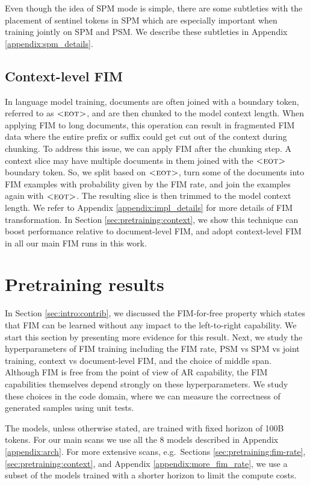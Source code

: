 \documentclass[postscript]{article}
\begin{document}
Even though the idea of SPM mode is simple, there are some subtleties with the placement of sentinel tokens in SPM which are especially important when training jointly on SPM and PSM. We describe these subtleties in Appendix \ref{appendix:spm_details}.
 
\subsection{Context-level FIM}\label{sec:contex_impl}

In language model training,  documents are often joined with a boundary token, referred to as $\textsc{<eot>}$, and are then chunked to the model context length.
When  applying FIM to long documents, this operation can result in fragmented FIM data where the entire prefix or suffix could get cut out of the context during chunking. To address this issue, we can apply FIM after the chunking step. A context slice may have multiple documents in them joined with the $\textsc{<eot>}$ boundary token. So, we split based on $\textsc{<eot>}$, turn some of the documents into FIM examples with probability given by the FIM rate, and join the examples again with $\textsc{<eot>}$. The resulting slice is then trimmed to the model context length. We refer to Appendix \ref{appendix:impl_details} for more details of FIM transformation.
In Section \ref{sec:pretraining:context}, we show this technique can boost performance relative to document-level FIM, and adopt context-level FIM in all our main FIM runs in this work. 



\section{Pretraining results}
\label{sec:pretraining}

In Section \ref{sec:intro:contrib}, we discussed the FIM-for-free property which states that FIM can be learned without any impact to the left-to-right capability. We start this section by presenting more evidence for this result. Next, we study the hyperparameters of FIM training including the FIM rate, PSM vs SPM vs joint training, context vs document-level FIM, and the choice of middle span. Although FIM is free from the point of view of AR capability, the FIM capabilities themselves depend strongly on these hyperparameters. We study these choices in the code domain, where we can measure the correctness of generated samples using unit tests.

The models, unless otherwise stated, are trained with fixed horizon of 100B tokens. For our main scans we use all the 8 models described in Appendix \ref{appendix:arch}. For more extensive scans, e.g.~Sections \ref{sec:pretraining:fim-rate}, \ref{sec:pretraining:context}, and Appendix \ref{appendix:more_fim_rate}, we use a subset of the models trained with a shorter horizon to limit the compute costs. 
\end{document}
